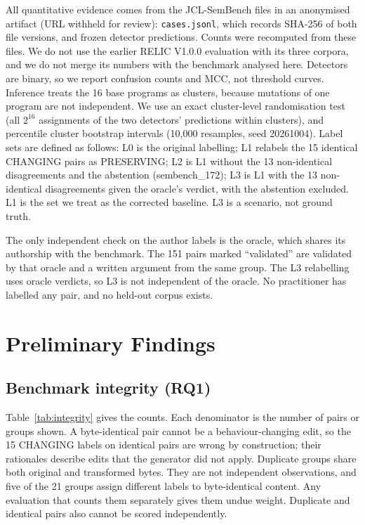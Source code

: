 \documentclass[conference]{IEEEtran}
\begin{document}
All quantitative evidence comes from the JCL-SemBench files in an anonymised artifact (URL withheld for review): \texttt{cases.jsonl}, which records SHA-256 of both file versions, and frozen detector predictions. Counts were recomputed from these files. We do not use the earlier RELIC V1.0.0 evaluation with its three corpora, and we do not merge its numbers with the benchmark analysed here. Detectors are binary, so we report confusion counts and MCC, not threshold curves. Inference treats the 16 base programs as clusters, because mutations of one program are not independent. We use an exact cluster-level randomisation test (all $2^{16}$ assignments of the two detectors' predictions within clusters), and percentile cluster bootstrap intervals (10{,}000 resamples, seed 20261004). Label sets are defined as follows: L0 is the original labelling; L1 relabels the 15 identical CHANGING pairs as PRESERVING; L2 is L1 without the 13 non-identical disagreements and the abstention (sembench\_172); L3 is L1 with the 13 non-identical disagreements given the oracle's verdict, with the abstention excluded. L1 is the set we treat as the corrected baseline. L3 is a scenario, not ground truth.

The only independent check on the author labels is the oracle, which shares its authorship with the benchmark. The 151 pairs marked ``validated'' are validated by that oracle and a written argument from the same group. The L3 relabelling uses oracle verdicts, so L3 is not independent of the oracle. No practitioner has labelled any pair, and no held-out corpus exists.

\section{Preliminary Findings}
\subsection{Benchmark integrity (RQ1)}
Table~\ref{tab:integrity} gives the counts. Each denominator is the number of pairs or groups shown. A byte-identical pair cannot be a behaviour-changing edit, so the 15 CHANGING labels on identical pairs are wrong by construction; their rationales describe edits that the generator did not apply. Duplicate groups share both original and transformed bytes. They are not independent observations, and five of the 21 groups assign different labels to byte-identical content. Any evaluation that counts them separately gives them undue weight. Duplicate and identical pairs also cannot be scored independently.
\end{document}
